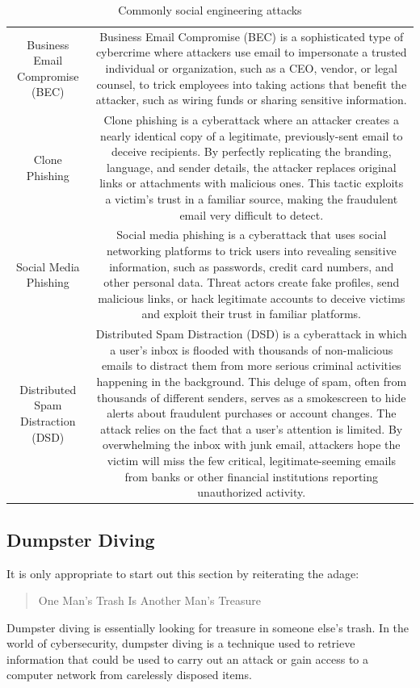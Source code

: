 {\begin{table}
\begin{tabular}{cc}
         Business Email Compromise (BEC)& Business Email Compromise (BEC) is a sophisticated type of cybercrime where attackers use email to impersonate a trusted individual or organization, such as a CEO, vendor, or legal counsel, to trick employees into taking actions that benefit the attacker, such as wiring funds or sharing sensitive information.\\
         Clone Phishing& Clone phishing is a cyberattack where an attacker creates a nearly identical copy of a legitimate, previously-sent email to deceive recipients. By perfectly replicating the branding, language, and sender details, the attacker replaces original links or attachments with malicious ones. This tactic exploits a victim's trust in a familiar source, making the fraudulent email very difficult to detect.\\
         Social Media Phishing& Social media phishing is a cyberattack that uses social networking platforms to trick users into revealing sensitive information, such as passwords, credit card numbers, and other personal data. Threat actors create fake profiles, send malicious links, or hack legitimate accounts to deceive victims and exploit their trust in familiar platforms.\\
         Distributed Spam Distraction (DSD)& Distributed Spam Distraction (DSD) is a cyberattack in which a user's inbox is flooded with thousands of non-malicious emails to distract them from more serious criminal activities happening in the background. This deluge of spam, often from thousands of different senders, serves as a smokescreen to hide alerts about fraudulent purchases or account changes. The attack relies on the fact that a user's attention is limited. By overwhelming the inbox with junk email, attackers hope the victim will miss the few critical, legitimate-seeming emails from banks or other financial institutions reporting unauthorized activity.\\
    \end{tabular}
    \caption{Commonly social engineering attacks}
    \label{tab:placeholder}
\end{table}
\subsection{Dumpster Diving}
It is only appropriate to start out this section by reiterating the adage:
\begin{quote}
    One Man's Trash Is Another Man's Treasure
\end{quote}
Dumpster diving is essentially looking for treasure in someone else's trash. In the world of cybersecurity, dumpster diving is a technique used to retrieve information that could be used to carry out an attack or gain access to a computer network from carelessly disposed items.

}
